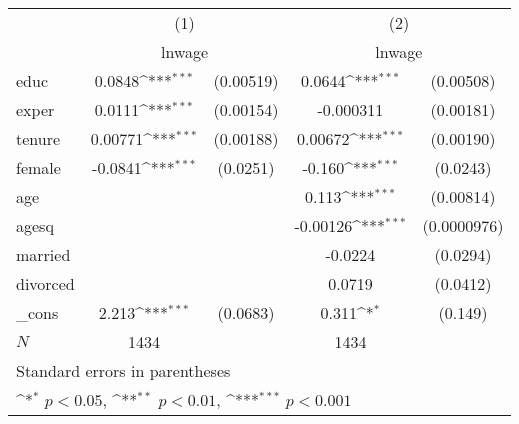 \def\sym#1{\ifmmode^{#1}\else\(^{#1}\)\fi}
\begin{tabular}{l*{2}{cc}}
\hline\hline
            &\multicolumn{2}{c}{(1)}           &\multicolumn{2}{c}{(2)}           \\
            &\multicolumn{2}{c}{lnwage}        &\multicolumn{2}{c}{lnwage}        \\
\hline
educ        &      0.0848\sym{***}&   (0.00519)&      0.0644\sym{***}&   (0.00508)\\
exper       &      0.0111\sym{***}&   (0.00154)&   -0.000311         &   (0.00181)\\
tenure      &     0.00771\sym{***}&   (0.00188)&     0.00672\sym{***}&   (0.00190)\\
female      &     -0.0841\sym{***}&    (0.0251)&      -0.160\sym{***}&    (0.0243)\\
age         &                     &            &       0.113\sym{***}&   (0.00814)\\
agesq       &                     &            &    -0.00126\sym{***}& (0.0000976)\\
married     &                     &            &     -0.0224         &    (0.0294)\\
divorced    &                     &            &      0.0719         &    (0.0412)\\
\_cons      &       2.213\sym{***}&    (0.0683)&       0.311\sym{*}  &     (0.149)\\
\hline
\(N\)       &        1434         &            &        1434         &            \\
\hline\hline
\multicolumn{5}{l}{\footnotesize Standard errors in parentheses}\\
\multicolumn{5}{l}{\footnotesize \sym{*} \(p<0.05\), \sym{**} \(p<0.01\), \sym{***} \(p<0.001\)}\\
\end{tabular}

